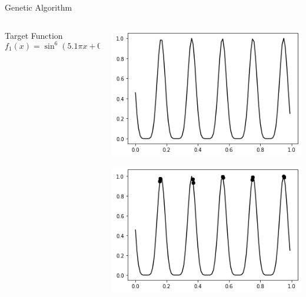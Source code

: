 \documentclass{beamer}
\begin{document}
\begin{frame}{Genetic Algorithm}
    \begin{columns}[c]
    \begin{column}{0.5\textwidth}
        Target Function
        \begin{equation}
        f_{1}(x)=\sin^{6}(5.1 \pi x+0.5)
        \end{equation}
    \end{column}
    \begin{column}{0.5\textwidth}
        \begin{center}
              \includegraphics[width=0.8\linewidth]{GA_images/example-sin.png}
        \end{center}
        \begin{center}
              \includegraphics[width=0.8\linewidth]{GA_images/example-sin-result.png}
        \end{center}
    \end{column}

\end{columns}


\end{frame}
\end{document}
